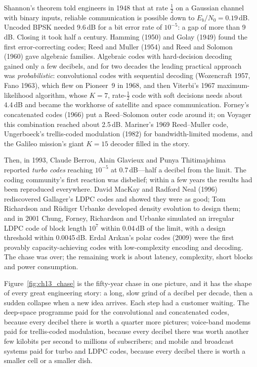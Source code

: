 \begin{history}
Shannon's theorem told engineers in 1948 that at rate $\frac12$ on a Gaussian channel with binary
inputs, reliable communication is possible down to $E_b/N_0=0.19$\,dB. Uncoded BPSK needed 9.6\,dB
for a bit error rate of $10^{-5}$: a gap of more than 9\,dB. Closing it took half a century.
Hamming (1950) and Golay (1949) found the first error-correcting codes; Reed and Muller (1954) and
Reed and Solomon (1960) gave algebraic families. Algebraic codes with hard-decision decoding gained
only a few decibels, and for two decades the leading practical approach was \emph{probabilistic}:
convolutional codes with sequential decoding (Wozencraft 1957, Fano 1963), which flew on Pioneer~9
in 1968, and then Viterbi's 1967 maximum-likelihood algorithm, whose $K=7$, rate-$\frac12$ code with
soft decisions needs about 4.4\,dB and became the workhorse of satellite and space communication.
Forney's concatenated codes (1966) put a Reed--Solomon outer code around it; on Voyager this
combination reached about 2.5\,dB. Mariner's 1969 Reed--Muller code, Ungerboeck's trellis-coded
modulation (1982) for bandwidth-limited modems, and the Galileo mission's giant $K=15$ decoder filled
in the story.

Then, in 1993, Claude Berrou, Alain Glavieux and Punya Thitimajshima reported \emph{turbo codes}
reaching $10^{-5}$ at 0.7\,dB---half a decibel from the limit. The coding community's first
reaction was disbelief; within a few years the results had been reproduced everywhere. David MacKay
and Radford Neal (1996) rediscovered Gallager's LDPC codes and showed they were as good; Tom
Richardson and R\"udiger Urbanke developed density evolution to design them; and in 2001 Chung,
Forney, Richardson and Urbanke simulated an irregular LDPC code of block length $10^7$ within
0.04\,dB of the limit, with a design threshold within 0.0045\,dB. Erdal Ar{\i}kan's polar codes (2009)
were the first provably capacity-achieving codes with low-complexity encoding and decoding. The chase
was over; the remaining work is about latency, complexity, short blocks and power consumption.
\end{history}

Figure~\ref{fig:ch13_chase} is the fifty-year chase in one picture, and it has the shape of every
great engineering story: a long, slow grind of a decibel per decade, then a sudden collapse when a
new idea arrives. Each step had a customer waiting. The deep-space programme paid for the
convolutional and concatenated codes, because every decibel there is worth a quarter more pictures;
voice-band modems paid for trellis-coded modulation, because every decibel there was worth another
few kilobits per second to millions of subscribers; and mobile and broadcast systems paid for turbo
and LDPC codes, because every decibel there is worth a smaller cell or a smaller dish.

